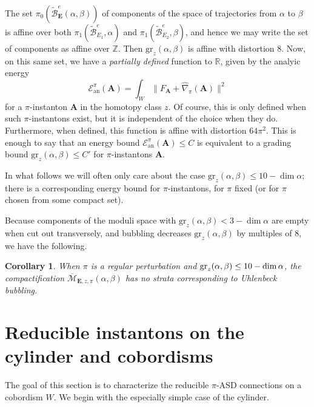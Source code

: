 \documentclass{memo-l}
\newtheorem{corollary}[theorem]{Corollary}
\theoremstyle{definition}
\theoremstyle{remark}
\numberwithin{section}{chapter}
\numberwithin{equation}{chapter}
\begin{document}
The set $\pi_0\left(\widetilde{\mathcal B}^e_{\mathbf{E}}(\alpha, \beta)\right)$ of components of the space of trajectories from $\alpha$ to $\beta$ is affine over both $\pi_1(\widetilde{\mathcal B}^e_{E_1}, \alpha)$ and $\pi_1(\widetilde{\mathcal B}^e_{E_2},\beta)$, and hence we may write the set of components as affine over $\mathbb Z$. Then $\text{gr}_z(\alpha, \beta)$ is affine with distortion $8$. Now, on this same set, we have a \emph{partially defined} function to $\mathbb R$, given by the analyic energy
$$\mathcal E^\pi_{\text{an}}(\mathbf{A}) = \int_W \|F_{\mathbf{A}} + \widehat{\nabla}_\pi(\mathbf{A})\|^2$$
for a $\pi$-instanton $\mathbf{A}$ in the homotopy class $z$. Of course, this is only defined when such $\pi$-instantons exist, but it is independent of the choice when they do. Furthermore, when defined, this function is affine with distortion $64\pi^2$. This is enough to say that an energy bound $\mathcal E^\pi_{\text{an}}(\mathbf{A}) \leq C$ is equivalent to a grading bound $\text{gr}_z(\alpha, \beta) \leq C'$ for $\pi$-instantons $\mathbf{A}$.

In what follows we will often only care about the case $\text{gr}_z(\alpha, \beta) \leq 10 - \dim \alpha$; there is a corresponding energy bound for $\pi$-instantons, for $\pi$ fixed (or for $\pi$ chosen from some compact set).

Because components of the moduli space with $\text{gr}_z(\alpha, \beta) < 3 - \dim \alpha$ are empty when cut out transversely, and bubbling decreases $\text{gr}_z(\alpha,\beta)$ by multiples of $8$, we have the following.

\begin{corollary}\label{nobubbling}When $\pi$ is a regular perturbation and $\textup{gr}_z(\alpha, \beta) \leq 10 - \dim \alpha$, the compactification $\overline{\mathcal M}_{\mathbf{E},z,\pi}(\alpha,\beta)$ has no strata corresponding to Uhlenbeck bubbling.
\end{corollary}

\section{Reducible instantons on the cylinder and cobordisms}\label{sec:4d-red}
The goal of this section is to characterize the reducible $\pi$-ASD connections on a cobordism $W$. We begin with the especially simple case of the cylinder.
\end{document}
